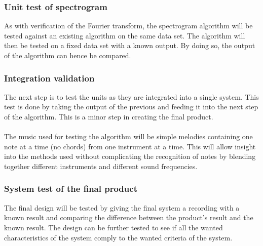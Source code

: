 \subsubsection{Unit test of spectrogram}
As with verification of the Fourier transform, the spectrogram algorithm will be tested against an existing algorithm on the same data set.
The algorithm will then be tested on a fixed data set with a known output.
By doing so, the output of the algorithm can hence be compared.
\subsubsection{Integration validation}
The next step is to test the units as they are integrated into a single system.
This test is done by taking the output of the previous and feeding it into the next step of the algorithm. 
This is a minor step in creating the final product.
\\\\
The music used for testing the algorithm will be simple melodies containing one note at a time (no chords) from one instrument at a time. This will allow insight into the methods used without complicating the recognition of notes by blending together different instruments and different sound frequencies.

\subsubsection{System test of the final product}
The final design will be tested by giving the final system a recording with a known result and comparing the difference between the product's result and the known result. The design can be further tested to see if all the wanted characteristics of the system comply to the wanted criteria of the system.